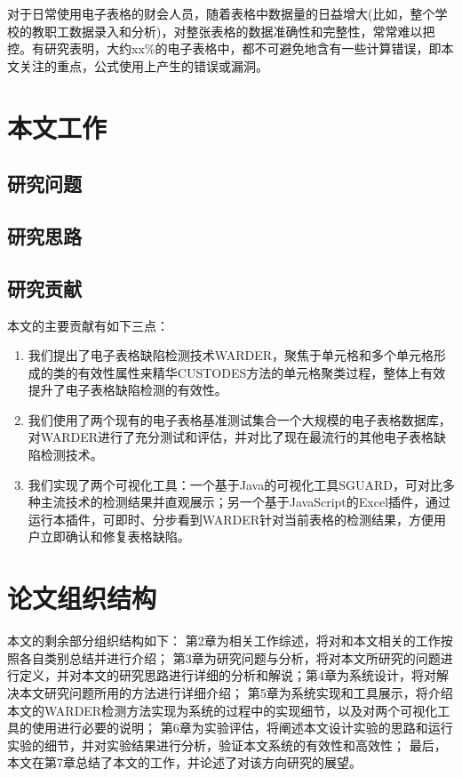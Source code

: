 对于日常使用电子表格的财会人员，随着表格中数据量的日益增大(比如，整个学校的教职工数据录入和分析)，对整张表格的数据准确性和完整性，常常难以把控。有研究表明，大约xx\%的电子表格中，都不可避免地含有一些计算错误，即本文关注的重点，公式使用上产生的错误或漏洞。

\section{本文工作}

\subsection{研究问题}


\subsection{研究思路}


\subsection{研究贡献}

本文的主要贡献有如下三点：

\begin{enumerate}
    \item 我们提出了电子表格缺陷检测技术WARDER，聚焦于单元格和多个单元格形成的类的有效性属性来精华CUSTODES方法的单元格聚类过程，整体上有效提升了电子表格缺陷检测的有效性。
    \item 我们使用了两个现有的电子表格基准测试集合一个大规模的电子表格数据库，对WARDER进行了充分测试和评估，并对比了现在最流行的其他电子表格缺陷检测技术。
    \item 我们实现了两个可视化工具：一个基于Java的可视化工具SGUARD，可对比多种主流技术的检测结果并直观展示；另一个基于JavaScript的Excel插件，通过运行本插件，可即时、分步看到WARDER针对当前表格的检测结果，方便用户立即确认和修复表格缺陷。
\end{enumerate}

\section{论文组织结构}

本文的剩余部分组织结构如下：
第2章为相关工作综述，将对和本文相关的工作按照各自类别总结并进行介绍；
第3章为研究问题与分析，将对本文所研究的问题进行定义，并对本文的研究思路进行详细的分析和解说；第4章为系统设计，将对解决本文研究问题所用的方法进行详细介绍；
第5章为系统实现和工具展示，将介绍本文的WARDER检测方法实现为系统的过程中的实现细节，以及对两个可视化工具的使用进行必要的说明；
第6章为实验评估，将阐述本文设计实验的思路和运行实验的细节，并对实验结果进行分析，验证本文系统的有效性和高效性；
最后，本文在第7章总结了本文的工作，并论述了对该方向研究的展望。